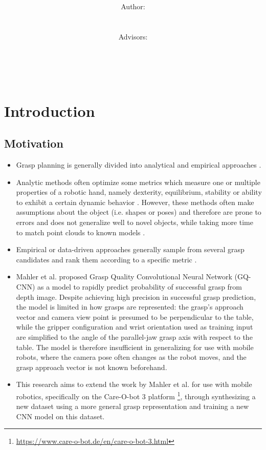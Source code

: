 \documentclass[12pt]{article}
\title{\normalsize \textsc{\hmwkAuthorSchool}   %
    \\[2.0cm]                                   %
    \HRule{0.5pt} \\                            %
    \LARGE \textbf{\uppercase{\hmwkTopic}}
    \HRule{2pt} \\ [0.5cm]                      %
    \hmwkTitle\\[0.5cm]
    \normalsize \hmwkDueDate\\
}
\author{
    \\[4.0cm]
    Author:\\
    \hmwkAuthorName\\
    \ \\
    Advisors:\\
    \hmwkAdvisorFirst\\
    \hmwkAdvisorSecond\\
    \hmwkAdvisorThird\\
}
\date{}
\begin{document}
    \maketitle
    \thispagestyle{firststyle}
    \newpage

\section{Introduction}

    \subsection{Motivation}
    \begin{itemize}
        \item Grasp planning is generally divided into analytical and empirical approaches \cite{Bohg2014}.
        \item Analytic methods often optimize some metrics which measure one or multiple properties of a robotic hand, namely dexterity, equilibrium, stability or ability to exhibit a certain dynamic behavior \cite{Bohg2014}. However, these methods often make assumptions about the object (i.e. shapes or poses) and therefore are prone to errors and does not generalize well to novel objects, while taking more time to match point clouds to known models \cite{Goldfeder2011}.
        \item Empirical or data-driven approaches generally sample from several grasp candidates and rank them according to a specific metric \cite{Bohg2014}. 
        \item Mahler et al. \cite{mahler2017} proposed Grasp Quality Convolutional Neural Network (GQ-CNN) as a model to rapidly predict probability of successful grasp from depth image. Despite achieving high precision in successful grasp prediction, the model is limited in how grasps are represented: the grasp's approach vector and camera view point is presumed to be perpendicular to the table, while the gripper configuration and wrist orientation used as training input are simplified to the angle of the parallel-jaw grasp axis with respect to the table. The model is therefore insufficient in generalizing for use with mobile robots, where the camera pose often changes as the robot moves, and the grasp approach vector is not known beforehand.
        \item This research aims to extend the work by Mahler et al. \cite{mahler2017} for use with mobile robotics, specifically on the Care-O-bot 3 platform \footnote{\url{https://www.care-o-bot.de/en/care-o-bot-3.html}}, through synthesizing a new dataset using a more general grasp representation and training a new CNN model on this dataset. 
    \end{itemize}
\end{document}
